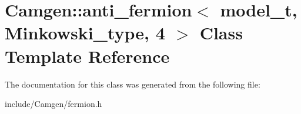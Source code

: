 \hypertarget{a00008}{}\section{Camgen\+:\+:anti\+\_\+fermion$<$ model\+\_\+t, Minkowski\+\_\+type, 4 $>$ Class Template Reference}
\label{a00008}


The documentation for this class was generated from the following file\+:\begin{DoxyCompactItemize}
\item 
include/\+Camgen/fermion.\+h\end{DoxyCompactItemize}
